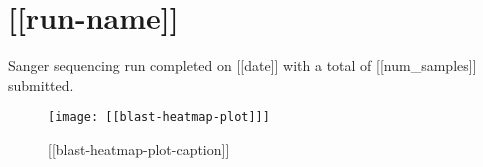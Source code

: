 \section{[[run-name]]}

Sanger sequencing run completed on [[date]] with a total of [[num_samples]]
submitted. 

\begin{figure}[h]
	\texttt{[image: [[blast-heatmap-plot]]]}
	\centering
	\caption{[[blast-heatmap-plot-caption]]}
\end{figure}